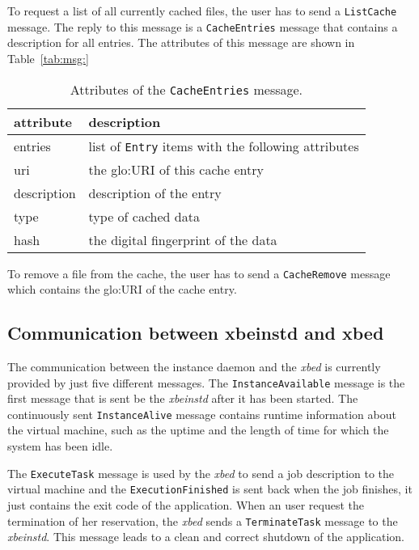 To request a  list of all currently  cached files, the user has  to send a
\texttt{ListCache}   message.    The   reply   to  this   message   is   a
\texttt{CacheEntries} message that contains a description for all entries.
The attributes of this message are shown in Table~\ref{tab:msg:}

\begin{table}[ht]
  \centering
  \begin{tabular}{@{}lp{}@{}}\toprule
    attribute        & \multicolumn{1}{l}{description} \\ \midrule %
    entries          & list of \texttt{Entry} items with the following attributes \\
    uri              & the \gls{glo:URI} of this cache entry \\
    description      & description of the entry \\
    type             & type of cached data \\
    hash             & the digital fingerprint of the data \\
    \bottomrule
  \end{tabular}
  \caption{Attributes of the \texttt{CacheEntries} message.}
  \label{tab:msg:cache-entries}
\end{table}

To   remove  a   file  from   the   cache,  the   user  has   to  send   a
\texttt{CacheRemove} message which contains the \gls{glo:URI} of the cache
entry.
 
\subsection{Communication between xbeinstd and xbed}

The  communication between  the  instance daemon  and  the \emph{xbed}  is
currently    provided   by    just   five    different    messages.    The
\texttt{InstanceAvailable} message  is the first  message that is  sent be
the  \emph{xbeinstd} after  it has  been started.   The  continuously sent
\texttt{InstanceAlive}  message  contains  runtime information  about  the
virtual machine, such  as the uptime and the length of  time for which the
system has been idle.

The \texttt{ExecuteTask} message is used  by the \emph{xbed} to send a job
description to  the virtual machine and  the \texttt{ExecutionFinished} is
sent back  when the job  finishes, it just  contains the exit code  of the
application. When an user request  the termination of her reservation, the
\emph{xbed}    sends    a    \texttt{TerminateTask}   message    to    the
\emph{xbeinstd}. This message leads to a clean and correct shutdown of the
application.


